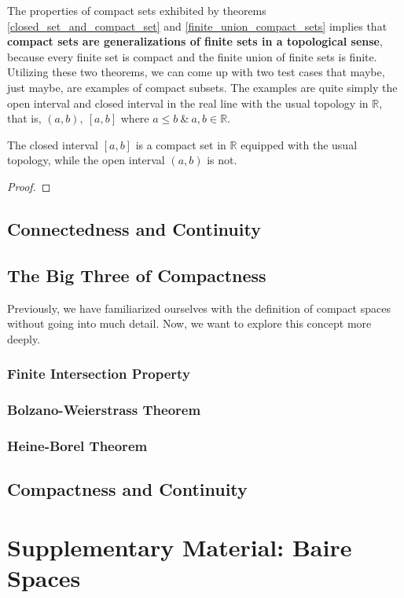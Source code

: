 \noindent The properties of compact sets exhibited by theorems \eqref{closed_set_and_compact_set} and \eqref{finite_union_compact_sets} implies that \textbf{compact sets are generalizations of finite sets in a topological sense}, because every finite set is compact\footnotemark {} and the finite union of finite sets is finite.\\ Utilizing these two theorems, we can come up with two test cases that maybe, just maybe, are examples of compact subsets. The examples are quite simply the open interval and closed interval in the real line with the usual topology in $\mathbb{R}$, that is, $(a,b),\ [a,b]$ where $a\leq b\ \&\ a,b\in\mathbb{R}$.
\begin{Example}
    The closed interval $[a,b]$ is a compact set in $\mathbb{R}$ equipped with the usual topology, while the open interval $(a,b)$ is not.
\end{Example}
\begin{proof}
    
\end{proof}
\subsection{Connectedness and Continuity}
\subsection{The Big Three of Compactness}
Previously, we have familiarized ourselves with the definition of compact spaces without going into much detail. Now, we want to explore this concept more deeply.
\subsubsection{Finite Intersection Property}
\subsubsection{Bolzano-Weierstrass Theorem}
\subsubsection{Heine-Borel Theorem}
\subsection{Compactness and Continuity}
\section{Supplementary Material: Baire Spaces}
